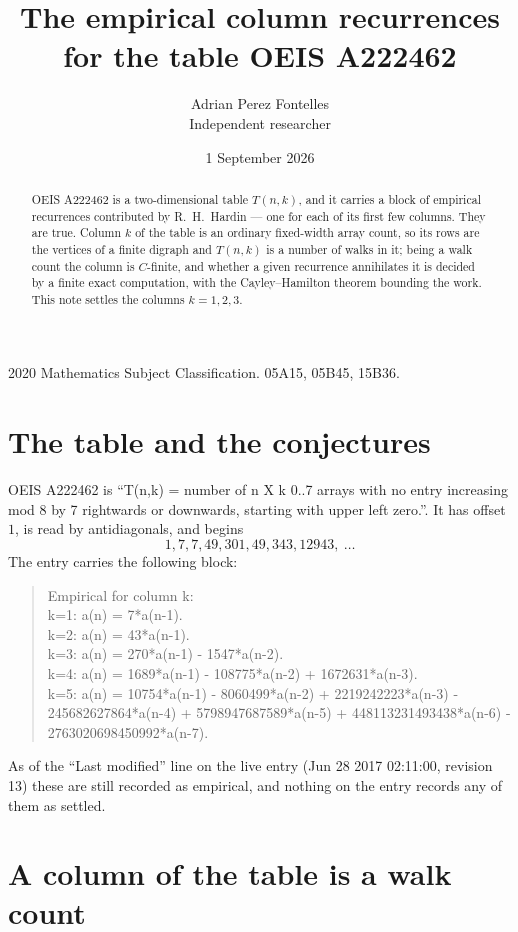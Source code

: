 \documentclass[11pt,a4paper]{article}
\title{The empirical column recurrences for the table OEIS A222462}
\author{Adrian Perez Fontelles\\ \small Independent researcher}
\date{1 September 2026}
\theoremstyle{plain}
\theoremstyle{definition}
\begin{document}
\maketitle

\begin{abstract}
OEIS A222462 is a two-dimensional table $T(n,k)$, and it carries a block of empirical
recurrences contributed by R.~H.~Hardin --- one for each of its first few columns. They are
true. Column $k$ of the table is an ordinary fixed-width array count, so its rows are the
vertices of a finite digraph and $T(n,k)$ is a number of walks in it; being a walk count the
column is $C$-finite, and whether a given recurrence annihilates it is decided by a finite
exact computation, with the Cayley--Hamilton theorem bounding the work. This note settles the columns $k=1, 2, 3$.
\end{abstract}

\noindent\small 2020 Mathematics Subject Classification. 05A15, 05B45, 15B36.\normalsize

\section{The table and the conjectures}

OEIS A222462 is ``T(n,k) = number of n X k 0..7 arrays with no entry increasing mod 8 by 7 rightwards or downwards, starting with upper left zero.''. It has offset $1$, is
read by antidiagonals, and begins
\[
1, 7, 7, 49, 301, 49, 343, 12943,\ \dots
\]
The entry carries the following block:
\begin{quote}\small
Empirical for column k:\\
k=1: a(n) = 7*a(n-1).\\
k=2: a(n) = 43*a(n-1).\\
k=3: a(n) = 270*a(n-1) - 1547*a(n-2).\\
k=4: a(n) = 1689*a(n-1) - 108775*a(n-2) + 1672631*a(n-3).\\
k=5: a(n) = 10754*a(n-1) - 8060499*a(n-2) + 2219242223*a(n-3) - 245682627864*a(n-4) + 5798947687589*a(n-5) + 448113231493438*a(n-6) - 2763020698450992*a(n-7).\\
\end{quote}
As of the ``Last modified'' line on the live entry (Jun 28 2017 02:11:00, revision 13) these are still
recorded as empirical, and nothing on the entry records any of them as settled.

\section{A column of the table is a walk count}
\end{document}
